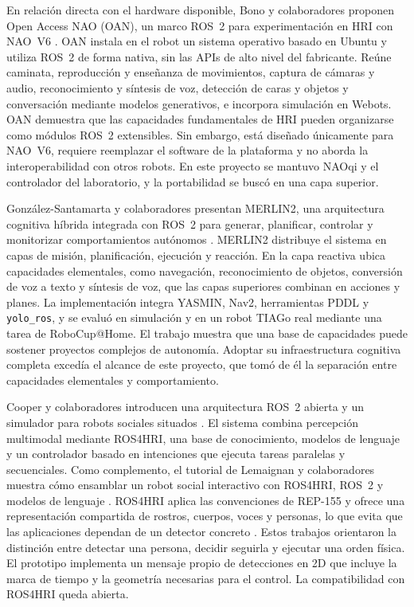 \documentclass[11pt,letterpaper]{article}
\newcommand{\code}[1]{\nolinkurl{#1}}
\begin{document}
En relación directa con el hardware disponible, Bono y colaboradores proponen Open Access NAO (OAN), un marco ROS~2 para experimentación en HRI con NAO~V6 \cite{oan}. OAN instala en el robot un sistema operativo basado en Ubuntu y utiliza ROS~2 de forma nativa, sin las APIs de alto nivel del fabricante. Reúne caminata, reproducción y enseñanza de movimientos, captura de cámaras y audio, reconocimiento y síntesis de voz, detección de caras y objetos y conversación mediante modelos generativos, e incorpora simulación en Webots. OAN demuestra que las capacidades fundamentales de HRI pueden organizarse como módulos ROS~2 extensibles. Sin embargo, está diseñado únicamente para NAO~V6, requiere reemplazar el software de la plataforma y no aborda la interoperabilidad con otros robots. En este proyecto se mantuvo NAOqi y el controlador del laboratorio, y la portabilidad se buscó en una capa superior.

González-Santamarta y colaboradores presentan MERLIN2, una arquitectura cognitiva híbrida integrada con ROS~2 para generar, planificar, controlar y monitorizar comportamientos autónomos \cite{merlin2}. MERLIN2 distribuye el sistema en capas de misión, planificación, ejecución y reacción. En la capa reactiva ubica capacidades elementales, como navegación, reconocimiento de objetos, conversión de voz a texto y síntesis de voz, que las capas superiores combinan en acciones y planes. La implementación integra YASMIN, Nav2, herramientas PDDL y \code{yolo_ros}, y se evaluó en simulación y en un robot TIAGo real mediante una tarea de RoboCup@Home. El trabajo muestra que una base de capacidades puede sostener proyectos complejos de autonomía. Adoptar su infraestructura cognitiva completa excedía el alcance de este proyecto, que tomó de él la separación entre capacidades elementales y comportamiento.

Cooper y colaboradores introducen una arquitectura ROS~2 abierta y un simulador para robots sociales situados \cite{cooper}. El sistema combina percepción multimodal mediante ROS4HRI, una base de conocimiento, modelos de lenguaje y un controlador basado en intenciones que ejecuta tareas paralelas y secuenciales. Como complemento, el tutorial de Lemaignan y colaboradores muestra cómo ensamblar un robot social interactivo con ROS4HRI, ROS~2 y modelos de lenguaje \cite{ros4hritutorial}. ROS4HRI aplica las convenciones de REP-155 y ofrece una representación compartida de rostros, cuerpos, voces y personas, lo que evita que las aplicaciones dependan de un detector concreto \cite{ros4hri}. Estos trabajos orientaron la distinción entre detectar una persona, decidir seguirla y ejecutar una orden física. El prototipo implementa un mensaje propio de detecciones en 2D que incluye la marca de tiempo y la geometría necesarias para el control. La compatibilidad con ROS4HRI queda abierta.
\end{document}
